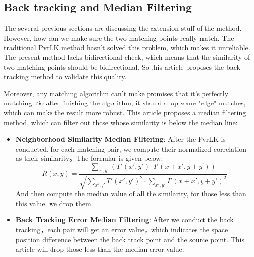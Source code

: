 \subsection{Back tracking and Median Filtering}
The several previous sections are discussing the extension stuff of the method. However, how can
we make sure the two matching points really match. The traditional PyrLK method hasn't solved this
problem, which makes it unreliable. The present method lacks bidirectional check, which means that
the similarity of two matching points should be bidirectional. So this article proposes the back
tracking method to validate this quality.

Moreover, any matching algorithm can't make promises that it's perfectly matching. So after finishing
the algorithm, it should drop some "edge" matches, which can make the result more robust. This article
proposes a median filtering method, which can filter out those whose similarity is below the median line:\\

\begin{itemize}
	\item \textbf{Neighborhood Similarity Median Filtering}: After the PyrLK is conducted, for each matching pair, 
		we compute their normalized correlation as their similarity。The formular is given below:\\
		\begin{equation} \label{eq:ccoeff}
			R(x,y) = \frac{\sum_{x',y'}(T'(x',y')\cdot I'(x + x', y + y'))}
			{\sqrt{\sum_{x', y'}T'(x',y')^2\cdot \sum_{x',y'}I'(x+x',y+y')^2}}
		\end{equation}
		And then compute the median value of all the similarity, for those less than this value, we drop them.
	\item \textbf{Back Tracking Error Median Filtering}: After we conduct the back tracking，each pair will get an error value，which indicates the
		space position difference between the back track point and the source point. This article will drop those less than the median error value.
\end{itemize}

